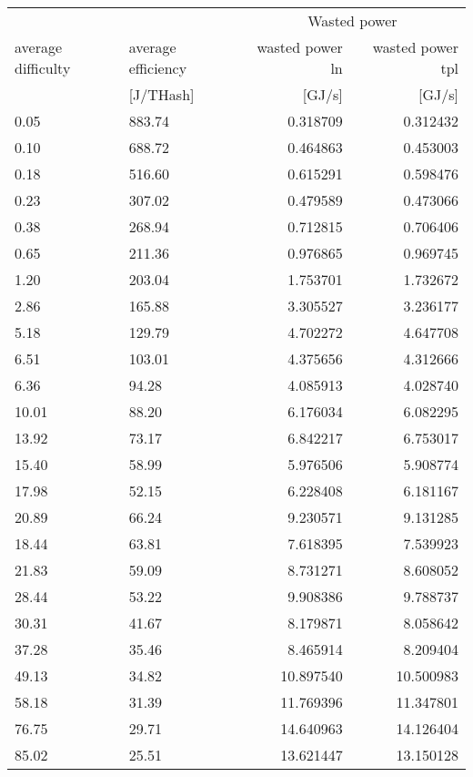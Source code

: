 \begin{tabular}{@{}llrr@{}}
\toprule
 &  & \multicolumn{2}{c}{Wasted power} \\
\cmidrule(lr){3-4} 
average difficulty & average efficiency & wasted power ln & wasted power tpl\\
[T] & [J/THash] & [GJ/s] & [GJ/s]\\
\cmidrule(lr){1-4}
0.05 & 883.74 & 0.318709 & 0.312432 \\
0.10 & 688.72 & 0.464863 & 0.453003 \\
0.18 & 516.60 & 0.615291 & 0.598476 \\
0.23 & 307.02 & 0.479589 & 0.473066 \\
0.38 & 268.94 & 0.712815 & 0.706406 \\
0.65 & 211.36 & 0.976865 & 0.969745 \\
1.20 & 203.04 & 1.753701 & 1.732672 \\
2.86 & 165.88 & 3.305527 & 3.236177 \\
5.18 & 129.79 & 4.702272 & 4.647708 \\
6.51 & 103.01 & 4.375656 & 4.312666 \\
6.36 & 94.28 & 4.085913 & 4.028740 \\
10.01 & 88.20 & 6.176034 & 6.082295 \\
13.92 & 73.17 & 6.842217 & 6.753017 \\
15.40 & 58.99 & 5.976506 & 5.908774 \\
17.98 & 52.15 & 6.228408 & 6.181167 \\
20.89 & 66.24 & 9.230571 & 9.131285 \\
18.44 & 63.81 & 7.618395 & 7.539923 \\
21.83 & 59.09 & 8.731271 & 8.608052 \\
28.44 & 53.22 & 9.908386 & 9.788737 \\
30.31 & 41.67 & 8.179871 & 8.058642 \\
37.28 & 35.46 & 8.465914 & 8.209404 \\
49.13 & 34.82 & 10.897540 & 10.500983 \\
58.18 & 31.39 & 11.769396 & 11.347801 \\
76.75 & 29.71 & 14.640963 & 14.126404 \\
85.02 & 25.51 & 13.621447 & 13.150128 \\
\bottomrule
\end{tabular}
